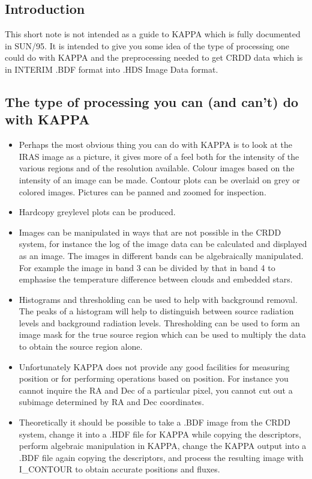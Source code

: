 \subsection{Introduction}

This short note is not intended as a guide to KAPPA which is fully documented
in SUN/95. It is intended to give you some idea of the type of processing one
could do with KAPPA and the preprocessing needed to get CRDD data which is in
INTERIM .BDF format into .HDS Image Data format.

\subsection{The type of processing you can (and can't) do with KAPPA}

\begin{itemize}
\item Perhaps the most obvious thing you can do with KAPPA is to look at the
IRAS image as a picture, it gives more of a feel both for the intensity of the
various regions and of the resolution available. Colour images based on the
intensity of an image can be made. Contour plots can be overlaid on grey or
colored images. Pictures can be panned and zoomed for inspection.
\item Hardcopy greylevel plots can be produced.
\item Images can be manipulated in ways that are not possible in the CRDD
system, for instance the log of the image data can be calculated and displayed
as an image. The images in different bands can be algebraically manipulated. For
example the image in band 3 can be divided by that in band 4 to emphasise the
temperature difference between clouds and embedded stars.
\item Histograms and thresholding can be used to help with background removal.
The peaks of a histogram will help to distinguish between source radiation
levels and background radiation levels. Thresholding can be used to form an
image mask for the true source region which can be used to multiply the data to
obtain the source region alone.
\item Unfortunately KAPPA does not provide any good facilities for measuring
position or for performing operations based on position. For instance you
cannot inquire the RA and Dec of a particular pixel, you cannot cut out a
subimage determined by RA and Dec coordinates.
\item Theoretically it should be possible to take a .BDF image from the CRDD
system, change it into a .HDF file for KAPPA while copying the descriptors,
perform algebraic manipulation in KAPPA, change the KAPPA output into a .BDF
file again copying the descriptors, and process the resulting image with
I\_CONTOUR to obtain accurate positions and fluxes.
\end{itemize}

